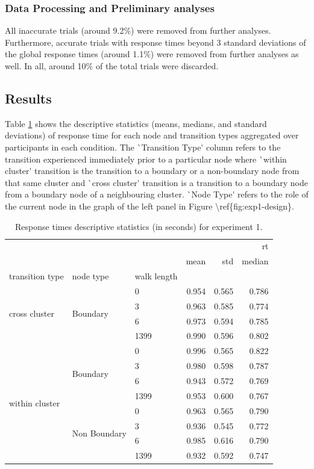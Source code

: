 \subsubsection*{Data Processing and Preliminary analyses}
All inaccurate trials (around 9.2\%) were removed from further analyses. Furthermore, accurate trials with response times beyond 3 standard deviations of the global response times (around 1.1\%) were removed from further analyses as well. In all, around 10\% of the total trials were discarded. 

\subsection{Results}
Table \ref{tab:exp1-rt-stats} shows the descriptive statistics \ac{(means, medians, and standard deviations)} of response time for each node and transition types \ac{aggregated over participants in each condition. The `Transition Type' column refers to the transition experienced immediately prior to a particular node where `within cluster' transition is the transition to a boundary or a non-boundary node from that same cluster and `cross cluster' transition is a transition to a boundary node from a boundary node of a neighbouring cluster. `Node Type' refers to the role of the current node in the graph of the left panel in Figure \ref{fig:exp1-design}.}

\begin{table}	
	\centering
	\caption{Response times descriptive statistics (in seconds) for experiment 1.}
	\label{tab:exp1-rt-stats}
	\begin{tabular}{lllrrr}
		\toprule
		 &  &  & \multicolumn{3}{r}{rt} \\
		 &  &  & mean & std & median \\
		transition type & node type & walk length &  &  &  \\
		\midrule
		\multirow[t]{4}{*}{cross cluster} & \multirow[t]{4}{*}{Boundary} & 0 & 0.954 & 0.565 & 0.786 \\
		 &  & 3 & 0.963 & 0.585 & 0.774 \\
		 &  & 6 & 0.973 & 0.594 & 0.785 \\
		 &  & 1399 & 0.990 & 0.596 & 0.802 \\
		\cline{1-6} \cline{2-6}
		\multirow[t]{8}{*}{within cluster} & \multirow[t]{4}{*}{Boundary} & 0 & 0.996 & 0.565 & 0.822 \\
		 &  & 3 & 0.980 & 0.598 & 0.787 \\
		 &  & 6 & 0.943 & 0.572 & 0.769 \\
		 &  & 1399 & 0.953 & 0.600 & 0.767 \\
		\cline{2-6}
		 & \multirow[t]{4}{*}{Non Boundary} & 0 & 0.963 & 0.565 & 0.790 \\
		 &  & 3 & 0.936 & 0.545 & 0.772 \\
		 &  & 6 & 0.985 & 0.616 & 0.790 \\
		 &  & 1399 & 0.932 & 0.592 & 0.747 \\
		\cline{1-6} \cline{2-6}
		\bottomrule
		\end{tabular}
	\end{table}
	

